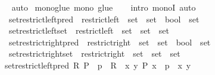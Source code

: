 \begin{isabellebody}
\isadelimproof
\ %
\endisadelimproof
%
\isatagproof
{}\isamarkupfalse%
\ auto%
\endisatagproof
{\isafoldproof}%
%
\isadelimproof
%
\endisadelimproof
\isanewline
\isanewline
{}\isamarkupfalse%
\ mono{\isacharunderscore}{\kern0pt}glue{\isacharcolon}{\kern0pt}\ {\isachardoublequoteopen}mono\ glue{\isachardoublequoteclose}\isanewline
%
\isadelimproof
\ \ %
\endisadelimproof
%
\isatagproof
{}\isamarkupfalse%
\ {\isacharparenleft}{\kern0pt}intro\ monoI{\isacharparenright}{\kern0pt}\ auto%
\endisatagproof
{\isafoldproof}%
%
\isadelimproof
\isanewline
%
\endisadelimproof
\isanewline
{}\isamarkupfalse%
\isanewline
\ \ set{\isacharunderscore}{\kern0pt}restrict{\isacharunderscore}{\kern0pt}left{\isacharunderscore}{\kern0pt}pred\ {\isasymequiv}\ {\isachardoublequoteopen}restrict{\isacharunderscore}{\kern0pt}left\ {\isacharcolon}{\kern0pt}{\isacharcolon}{\kern0pt}\ set\ {\isasymRightarrow}\ {\isacharparenleft}{\kern0pt}set\ {\isasymRightarrow}\ bool{\isacharparenright}{\kern0pt}\ {\isasymRightarrow}\ set{\isachardoublequoteclose}\isanewline
\ \ set{\isacharunderscore}{\kern0pt}restrict{\isacharunderscore}{\kern0pt}left{\isacharunderscore}{\kern0pt}set\ {\isasymequiv}\ {\isachardoublequoteopen}restrict{\isacharunderscore}{\kern0pt}left\ {\isacharcolon}{\kern0pt}{\isacharcolon}{\kern0pt}\ set\ {\isasymRightarrow}\ set\ {\isasymRightarrow}\ set{\isachardoublequoteclose}\isanewline
\ \ set{\isacharunderscore}{\kern0pt}restrict{\isacharunderscore}{\kern0pt}right{\isacharunderscore}{\kern0pt}pred\ {\isasymequiv}\ {\isachardoublequoteopen}restrict{\isacharunderscore}{\kern0pt}right\ {\isacharcolon}{\kern0pt}{\isacharcolon}{\kern0pt}\ set\ {\isasymRightarrow}\ {\isacharparenleft}{\kern0pt}set\ {\isasymRightarrow}\ bool{\isacharparenright}{\kern0pt}\ {\isasymRightarrow}\ set{\isachardoublequoteclose}\isanewline
\ \ set{\isacharunderscore}{\kern0pt}restrict{\isacharunderscore}{\kern0pt}right{\isacharunderscore}{\kern0pt}set\ {\isasymequiv}\ {\isachardoublequoteopen}restrict{\isacharunderscore}{\kern0pt}right\ {\isacharcolon}{\kern0pt}{\isacharcolon}{\kern0pt}\ set\ {\isasymRightarrow}\ set\ {\isasymRightarrow}\ set{\isachardoublequoteclose}\isanewline
{}\isanewline
\ \ \isamarkupfalse%
\ {\isachardoublequoteopen}set{\isacharunderscore}{\kern0pt}restrict{\isacharunderscore}{\kern0pt}left{\isacharunderscore}{\kern0pt}pred\ R\ P\ {\isasymequiv}\ {\isacharbraceleft}{\kern0pt}p\ {\isasymin}\ R\ {\isacharbar}{\kern0pt}\ {\isasymexists}x\ y{\isachardot}{\kern0pt}\ P\ x\ {\isasymand}\ p\ {\isacharequal}{\kern0pt}\ {\isasymlangle}x{\isacharcomma}{\kern0pt}\ y{\isasymrangle}{\isacharbraceright}{\kern0pt}{\isachardoublequoteclose}\isanewline

\end{isabellebody}
